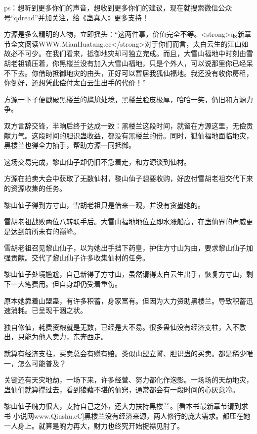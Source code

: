 
\begin{this_body}

ps：想听到更多你们的声音，想收到更多你们的建议，现在就搜索微信公众号“qdread”并加关注，给《蛊真人》更多支持！

方源是多么精明的人物，立即摇头：“这两件事，价值完全不等。<strong>最新章节全文阅读WWW.MianHuatang.cc</strong>对于你们而言，太白云生的江山如故必不可少。在我们看来，抵御地灾却可独立完成。而且，大雪山福地中时刻由雪胡老祖镇压着，你黑楼兰没有加入大雪山福地，只是个外人，可以说那里你已经呆不下去。你借助抵御地灾的由头，正好可以暂居我狐仙福地。我还没有收你房租，你倒好，还想凭此偿付太白云生出手的代价！”

方源一下子便戳破黑楼兰的尴尬处境，黑楼兰脸皮极厚，哈哈一笑，仍旧和方源力争。

双方言辞交锋，半晌后终于达成一致：黑楼兰这段时间，就留在方源这里，无偿贡献力气。这段时间的胆识蛊收益，都没有黑楼兰的份。同时，狐仙福地面临地灾，黑楼兰也得全力抽手，帮助方源一同抵御。

这场交易完成，黎山仙子却仍旧不急着走，和方源谈到仙材。

方源在拍卖大会中获取了无数仙材，黎山仙子想要收购，好应付雪胡老祖交代下来的资源收集的任务。

黎山仙子得到方寸山，雪胡老祖只是借来一观，并没有贪墨她的。

雪胡老祖战败两位八转联手后。大雪山福地地位立即水涨船高，在蛊仙界的声威更是达到前所未有的巅峰。

雪胡老祖召见黎山仙子，以为她出手挡下药皇，护住方寸山为由，要求黎山仙子加强贡献。交代了黎山仙子许多收集仙材的任务。

黎山仙子处境尴尬，自己新得了方寸山，虽然请得太白云生出手，恢复方寸山，剩下一大笔费用。但自身却仍受着重伤。

原本她靠着山盟蛊，有许多积蓄，身家富有。但因为大力资助黑楼兰。导致积蓄迅速消耗。已呈现干涸之状。

独自修仙，耗费资粮就是无数，已经是大不易。很多蛊仙没有经济支柱，入不敷出，只能为他人卖力，东奔西走。

就算有经济支柱，买卖总会有赚有赔。类似山盟立誓、胆识蛊的买卖。都是稀少唯一，怎么可能普及？

关键还有天灾地劫，一场下来，许多经营、努力都化作泡影。一场场的天劫地灾，蛊仙们就算撑过去，看到狼藉不堪的仙窍，通常都会有一段时间的心灰意冷。

黎山仙子魄力很大，支持自己之外，还大力扶持黑楼兰。[看本书最新章节请到求书 小说网www.Qiushu.cC]黑楼兰没有经济来源，两人修行的庞大需求。都压在她一人身上。就算是魄力再大，财力也终究开始捉襟见肘了。


\end{this_body}
